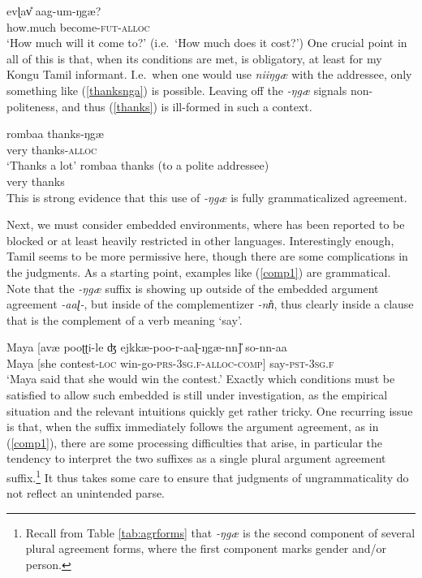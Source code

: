 \documentclass[output=paper, modfonts, nonflat]{langsci/langscibook}
\begin{document}
\ea\label{whquestion}\gll evɭav\U{} aag-um-ŋgæ?\\
{how.much} become-\textsc{fut}-\textsc{alloc}\\
\glt `How much will it come to?' (i.e.\ `How much does it cost?')
\z
%
One crucial point in all of this is that, when its conditions are met,
\allagr{} is obligatory, at least for my Kongu Tamil informant.  I.e.\
when one would use \textit{niiŋgæ} with the addressee, only something
like (\ref{thanksnga}) is possible. Leaving off the \textit{-ŋgæ}
signals non-politeness, and thus (\ref{thanks}) is ill-formed in such
a context.

\ea\label{oblig}
 \ea
   \label{thanksnga}\gll rombaa thanks-ŋgæ\\
   very thanks-\textsc{alloc}{}\\
   \glt `Thanks a lot'
 \ex
   \label{thanks}\gll *rombaa thanks (to a polite addressee)\\
   very thanks\\
 \z
\z
%
This is strong evidence that this use of \textit{-ŋgæ} is fully
grammaticalized agreement.


Next, we must consider embedded environments, where \allagr{} has been
reported to be blocked or at least heavily restricted in other
languages. Interestingly enough, Tamil seems to be more permissive
here, though there are some complications in the judgments. As a
starting point, examples like (\ref{comp1}) are grammatical. Note that
the \textit{-ŋgæ} suffix is showing up outside of the embedded
argument agreement \textit{-aaɭ-}, but inside of the complementizer
\textit{-nn\U}, thus clearly inside a clause that is the complement of
a verb meaning `say'.  

\ea\label{comp1}\gll Maya [avæ pooʈʈi-le ʤ
ejkkæ-poo-r-aaɭ-ŋgæ-nn\U] so-nn-aa\\  
Maya [she contest-\textsc{loc}{} win-go-\textsc{prs}-3\textsc{sg.f}-\textsc{alloc}-\textsc{comp}]
say-\textsc{pst}-3\textsc{sg.f}\\ 
\glt `Maya said that she would win the contest.'
\z
%
Exactly which conditions must be satisfied to allow such embedded
\allagr{} is still under investigation, as the empirical situation and
the relevant intuitions quickly get rather tricky. One recurring issue
is that, when the \allagr{} suffix immediately follows the argument
agreement, as in (\ref{comp1}), there are some processing difficulties
that arise, in particular the tendency to interpret the two suffixes
as a single plural argument agreement suffix.\footnote{Recall from
  Table \ref{tab:agrforms} that \textit{-ŋgæ} is the second component
  of several plural agreement forms, where the first component marks
  gender and/or person.} It thus takes some care to ensure that
judgments of ungrammaticality do not reflect an unintended parse.
\end{document}
